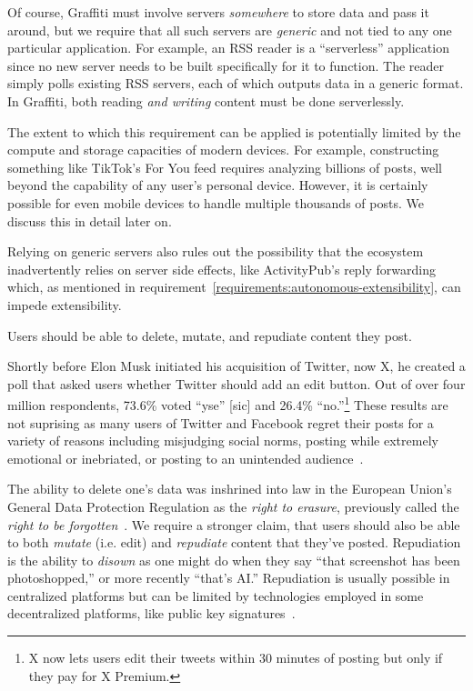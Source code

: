 Of course, Graffiti must involve servers \emph{somewhere} to store data
and pass it around, but we require that all such servers are \emph{generic}
and not tied to any one particular application.
For example, an RSS reader is a ``serverless'' application since
no new server needs to be built specifically for it to function.
The reader simply polls existing RSS servers, each of which outputs data in a generic format.
In Graffiti, both reading \emph{and writing} content must be done serverlessly.

The extent to which this requirement can be applied is potentially limited
by the compute and storage capacities of modern devices.
For example, constructing something like TikTok's For You feed requires
analyzing billions of posts, well beyond the capability of any user's personal device.
However, it is certainly possible for even mobile devices to handle multiple thousands of posts.
We discuss this in detail later on.

Relying on generic servers also rules out the possibility that
the ecosystem inadvertently relies on server side effects,
like ActivityPub's reply forwarding which, as mentioned in
requirement~\ref{requirements:autonomous-extensibility}, can impede extensibility.


\begin{requirement}[Forgiving]
\label{requirements:forgiving}
    Users should be able to delete, mutate, and repudiate content they post.
\end{requirement}

Shortly before Elon Musk initiated his acquisition of Twitter, now X,
he created a poll that asked users whether Twitter should add an edit button.
Out of over four million respondents, 73.6\% voted ``yse'' [sic] and 26.4\% ``no.''\footnote{
  X now lets users edit their tweets within 30 minutes of posting but only
  if they pay for X Premium.
} These results are not suprising as many users of Twitter and Facebook regret
their posts for a variety of reasons
including misjudging social norms, posting while extremely emotional or inebriated,
or posting to an unintended audience~\cite{regret, regrettwitter}.

The ability to delete one's data was inshrined into law in the European Union's
General Data Protection Regulation as
the \emph{right to erasure}, previously called the \emph{right to be forgotten}~\cite{gdpr}.
We require a stronger claim, that users should also be able to both \emph{mutate} (i.e. edit)
and \emph{repudiate} content that they've posted. Repudiation is the ability to \emph{disown}
as one might do when they say ``that screenshot has been photoshopped,''
or more recently ``that's AI.'' Repudiation is usually possible in centralized platforms
but can be limited by technologies employed in some decentralized platforms,
like public key signatures~\cite{offtherecord}.

